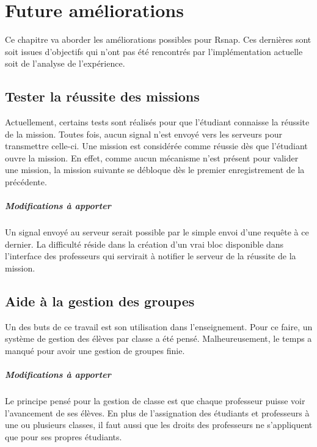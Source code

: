 \chapter{Future améliorations}
Ce chapitre va aborder les améliorations possibles pour Rsnap. Ces dernières sont soit issues d'objectifs qui n'ont pas été rencontrés par l'implémentation actuelle soit de l'analyse de l'expérience.

\section{Tester la réussite des missions}
Actuellement, certains tests sont réalisés pour que l'étudiant connaisse la réussite de la mission. Toutes fois, aucun signal n'est envoyé vers les serveurs pour transmettre celle-ci. Une mission est considérée comme réussie dès que l'étudiant ouvre la mission. En effet, comme aucun mécanisme n'est présent pour valider une mission, la mission suivante se débloque dès le premier enregistrement de la précédente.

\paragraph{Modifications à apporter}
Un signal envoyé au serveur serait possible par le simple envoi d'une requête à ce dernier. La difficulté réside dans la création d'un vrai bloc disponible dans l'interface des professeurs qui servirait à notifier le serveur de la réussite de la mission.

\section{Aide à la gestion des groupes}
Un des buts de ce travail est son utilisation dans l'enseignement. Pour ce faire, un système de gestion des élèves par classe a été pensé. Malheureusement, le temps a manqué pour avoir une gestion de groupes finie. 

\paragraph{Modifications à apporter}
Le principe pensé pour la gestion de classe est que chaque professeur puisse voir l'avancement de ses élèves. En plus de l'assignation des étudiants et professeurs à une ou plusieurs classes, il faut aussi que les droits des professeurs ne s'appliquent que pour ses propres étudiants. 

